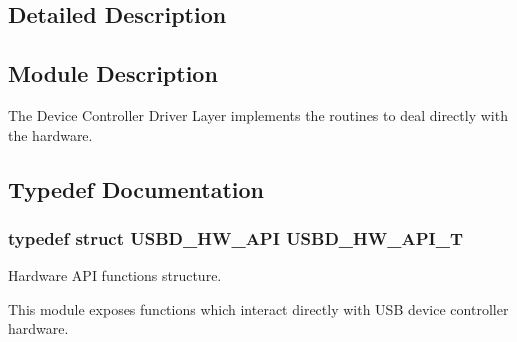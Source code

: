 \subsection{Detailed Description}
\hypertarget{group__USBD__HW_Sec_HWModDescription}{}\subsection{Module Description}\label{group__USBD__HW_Sec_HWModDescription}
The Device Controller Driver Layer implements the routines to deal directly with the hardware. 

\subsection{Typedef Documentation}
\hypertarget{group__USBD__HW_ga4df5b7beaddc4e9267c320d92b4434fc}{
\subsubsection[{U\-S\-B\-D\-\_\-\-H\-W\-\_\-\-A\-P\-I\-\_\-\-T}]{\setlength{\rightskip}{0pt plus 5cm}typedef struct {\bf U\-S\-B\-D\-\_\-\-H\-W\-\_\-\-A\-P\-I}  {\bf U\-S\-B\-D\-\_\-\-H\-W\-\_\-\-A\-P\-I\-\_\-\-T}}}\label{group__USBD__HW_ga4df5b7beaddc4e9267c320d92b4434fc}


Hardware A\-P\-I functions structure.

This module exposes functions which interact directly with U\-S\-B device controller hardware. 



